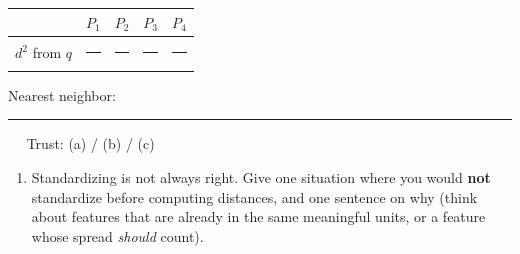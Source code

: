 \documentclass[
  11pt,
]{article}
\providecommand{\tightlist}{%
  \setlength{\itemsep}{0pt}\setlength{\parskip}{0pt}}
\newcommand{\answerspace}[1]{\par\vspace*{#1}}  %
\newcommand{\blank}[1][1.2in]{\rule{#1}{0.4pt}}
\begin{document}
\begin{longtable}[]{@{}
  >{\centering\arraybackslash}p{}
  >{\centering\arraybackslash}p{}
  >{\centering\arraybackslash}p{}
  >{\centering\arraybackslash}p{}
  >{\centering\arraybackslash}p{}@{}}
\toprule\noalign{}
\begin{minipage}[b]{\linewidth}\centering
\end{minipage} & \begin{minipage}[b]{\linewidth}\centering
\(P_1\)
\end{minipage} & \begin{minipage}[b]{\linewidth}\centering
\(P_2\)
\end{minipage} & \begin{minipage}[b]{\linewidth}\centering
\(P_3\)
\end{minipage} & \begin{minipage}[b]{\linewidth}\centering
\(P_4\)
\end{minipage} \\
\midrule\noalign{}
\endhead
\bottomrule\noalign{}
\endlastfoot
\(d^2\) from \(q\) & \blank[0.9in] & \blank[0.9in] & \blank[0.9in] &
\blank[0.9in] \\
\end{longtable}

Nearest neighbor: \blank[0.7in] \(\quad\) Trust: (a) / (b) / (c)

\answerspace{2in}

\begin{enumerate}
\def\labelenumi{(\alph{enumi})}
\setcounter{enumi}{3}
\tightlist
\item
  Standardizing is not always right. Give one situation where you would
  \textbf{not} standardize before computing distances, and one sentence
  on why (think about features that are already in the same meaningful
  units, or a feature whose spread \emph{should} count).
\end{enumerate}

\answerspace{1.8in}
\end{document}

